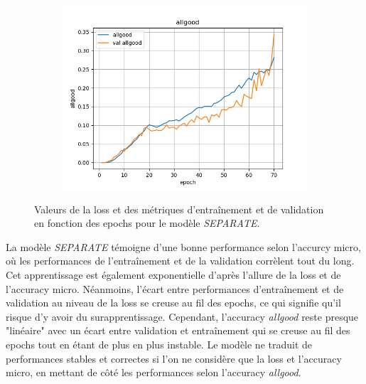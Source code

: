 \documentclass[a4paper]{article}
\begin{document}
\begin{figure}[H]
\begin{subfigure}{0.32\textwidth}
        \includegraphics[width=\linewidth]{../logs/separate/allgood.png}
    \end{subfigure}
    \caption{Valeurs de la loss et des métriques d'entraînement et de validation en fonction des epochs 
            pour le modèle \textit{SEPARATE}.}
    \label{fig: results separate}
\end{figure}

La modèle \textit{SEPARATE} témoigne d'une bonne performance selon l'accurcy micro, où les performances de l'entraînement et de la validation corrèlent tout du long. Cet apprentissage est également exponentielle d'après l'allure de la loss et de l'accuracy micro. Néanmoins, l'écart entre performances d'entraînement et de validation au niveau de la loss se creuse au fil des epochs, ce qui signifie qu'il risque d'y avoir du surapprentissage. Cependant, l'accuracy \textit{allgood} reste presque "linéaire" avec un écart entre
validation et entraînement qui se creuse au fil des epochs tout en étant de plus en plus instable. Le modèle ne traduit de performances stables et correctes si l'on ne considère que la loss et l'accuracy micro, en mettant de côté les performances selon l'accuracy \textit{allgood}.
\end{document}
